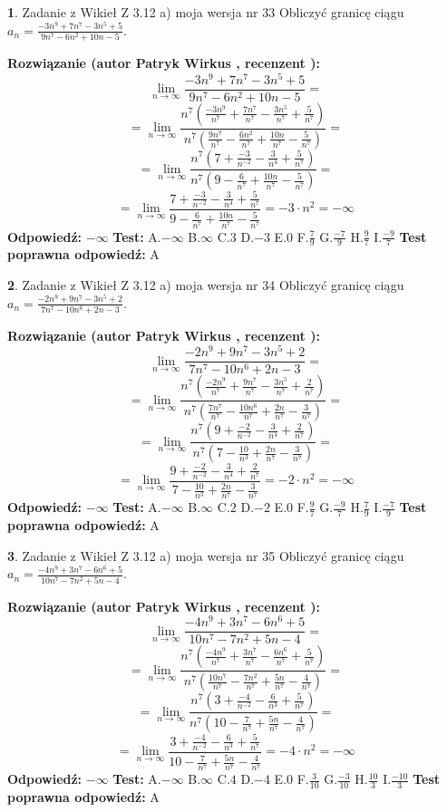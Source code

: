 \documentclass[12pt, a4paper]{article}
\theoremstyle{definition} %
\newtheorem{zad}{}
\newcommand{\zadStart}[1]{\begin{zad}#1\newline}
\newcommand{\zadStop}{\end{zad}}
\newcommand{\rozwStart}[2]{\noindent \textbf{Rozwiązanie (autor #1 , recenzent #2): }\newline}
\newcommand{\rozwStop}{\newline}
\newcommand{\odpStart}{\noindent \textbf{Odpowiedź:}\newline}
\newcommand{\odpStop}{\newline}
\newcommand{\testStart}{\noindent \textbf{Test:}\newline}
\newcommand{\testStop}{\newline}
\newcommand{\kluczStart}{\noindent \textbf{Test poprawna odpowiedź:}\newline}
\newcommand{\kluczStop}{\newline}
\begin{document}
\zadStart{Zadanie z Wikieł Z 3.12 a) moja wersja nr 33}
Obliczyć granicę ciągu $a_{n}=\frac{-3n^{9}+7n^{7}-3n^{5}+5}{9n^{7}-6n^{2}+10n-5}$.
\zadStop
\rozwStart{Patryk Wirkus}{}
$$\lim\limits_{n\to\infty}\frac{-3n^{9}+7n^{7}-3n^{5}+5}{9n^{7}-6n^{2}+10n-5}=$$
$$=\lim\limits_{n\to\infty}\frac{n^{7}\left(\frac{-3n^{9}}{n^{7}}+\frac{7n^{7}}{n^{7}}-\frac{3n^{5}}{n^{7}}+\frac{5}{n^{7}}\right)}{n^{7}\left(\frac{9n^{7}}{n^{7}}-\frac{6n^{2}}{n^{7}}+\frac{10n}{n^{7}}-\frac{5}{n^{7}}\right)}=$$
$$=\lim\limits_{n\to\infty}\frac{n^{7}\left(7+\frac{-3}{n^{-2}}-\frac{3}{n^{4}}+\frac{5}{n^{7}}\right)}
{n^{7}\left(9-\frac{6}{n^{7}}+\frac{10n}{n^{7}}-\frac{5}{n^{7}}\right)}=$$
$$=\lim\limits_{n\to\infty}\frac{7+\frac{-3}{n^{-2}}-\frac{3}{n^{4}}+\frac{5}{n^{7}}}{9-\frac{6}{n^{7}}+\frac{10n}{n^{7}}-\frac{5}{n^{7}}}=-3\cdot n^{2} = -\infty$$
\rozwStop
\odpStart
$-\infty$
\odpStop
\testStart
A.$-\infty$
B.$\infty$
C.$3$
D.$-3$
E.$0$
F.$\frac{7}{9}$
G.$\frac{-7}{9}$
H.$\frac{9}{7}$
I.$\frac{-9}{7}$
\testStop
\kluczStart
A
\kluczStop



\zadStart{Zadanie z Wikieł Z 3.12 a) moja wersja nr 34}
Obliczyć granicę ciągu $a_{n}=\frac{-2n^{9}+9n^{7}-3n^{5}+2}{7n^{7}-10n^{6}+2n-3}$.
\zadStop
\rozwStart{Patryk Wirkus}{}
$$\lim\limits_{n\to\infty}\frac{-2n^{9}+9n^{7}-3n^{5}+2}{7n^{7}-10n^{6}+2n-3}=$$
$$=\lim\limits_{n\to\infty}\frac{n^{7}\left(\frac{-2n^{9}}{n^{7}}+\frac{9n^{7}}{n^{7}}-\frac{3n^{5}}{n^{7}}+\frac{2}{n^{7}}\right)}{n^{7}\left(\frac{7n^{7}}{n^{7}}-\frac{10n^{6}}{n^{7}}+\frac{2n}{n^{7}}-\frac{3}{n^{7}}\right)}=$$
$$=\lim\limits_{n\to\infty}\frac{n^{7}\left(9+\frac{-2}{n^{-2}}-\frac{3}{n^{4}}+\frac{2}{n^{7}}\right)}
{n^{7}\left(7-\frac{10}{n^{3}}+\frac{2n}{n^{7}}-\frac{3}{n^{7}}\right)}=$$
$$=\lim\limits_{n\to\infty}\frac{9+\frac{-2}{n^{-2}}-\frac{3}{n^{4}}+\frac{2}{n^{7}}}{7-\frac{10}{n^{3}}+\frac{2n}{n^{7}}-\frac{3}{n^{7}}}=-2\cdot n^{2} = -\infty$$
\rozwStop
\odpStart
$-\infty$
\odpStop
\testStart
A.$-\infty$
B.$\infty$
C.$2$
D.$-2$
E.$0$
F.$\frac{9}{7}$
G.$\frac{-9}{7}$
H.$\frac{7}{9}$
I.$\frac{-7}{9}$
\testStop
\kluczStart
A
\kluczStop



\zadStart{Zadanie z Wikieł Z 3.12 a) moja wersja nr 35}
Obliczyć granicę ciągu $a_{n}=\frac{-4n^{9}+3n^{7}-6n^{6}+5}{10n^{7}-7n^{2}+5n-4}$.
\zadStop
\rozwStart{Patryk Wirkus}{}
$$\lim\limits_{n\to\infty}\frac{-4n^{9}+3n^{7}-6n^{6}+5}{10n^{7}-7n^{2}+5n-4}=$$
$$=\lim\limits_{n\to\infty}\frac{n^{7}\left(\frac{-4n^{9}}{n^{7}}+\frac{3n^{7}}{n^{7}}-\frac{6n^{6}}{n^{7}}+\frac{5}{n^{7}}\right)}{n^{7}\left(\frac{10n^{7}}{n^{7}}-\frac{7n^{2}}{n^{7}}+\frac{5n}{n^{7}}-\frac{4}{n^{7}}\right)}=$$
$$=\lim\limits_{n\to\infty}\frac{n^{7}\left(3+\frac{-4}{n^{-2}}-\frac{6}{n^{3}}+\frac{5}{n^{7}}\right)}
{n^{7}\left(10-\frac{7}{n^{7}}+\frac{5n}{n^{7}}-\frac{4}{n^{7}}\right)}=$$
$$=\lim\limits_{n\to\infty}\frac{3+\frac{-4}{n^{-2}}-\frac{6}{n^{3}}+\frac{5}{n^{7}}}{10-\frac{7}{n^{7}}+\frac{5n}{n^{7}}-\frac{4}{n^{7}}}=-4\cdot n^{2} = -\infty$$
\rozwStop
\odpStart
$-\infty$
\odpStop
\testStart
A.$-\infty$
B.$\infty$
C.$4$
D.$-4$
E.$0$
F.$\frac{3}{10}$
G.$\frac{-3}{10}$
H.$\frac{10}{3}$
I.$\frac{-10}{3}$
\testStop
\kluczStart
A
\kluczStop
\end{document}

